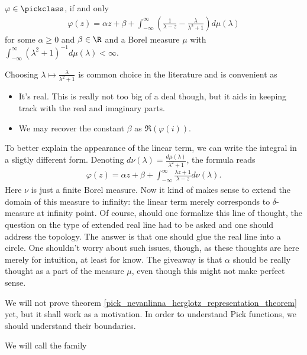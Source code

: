 \begin{lause}\label{pick_nevanlinna_herglotz_representation_theorem}
	$\varphi \in \pickclass$, if and only
	\begin{align}\label{pick_representation}
		\varphi(z) = \alpha z + \beta + \int_{-\infty}^{\infty} \left(\frac{1}{\lambda - z} - \frac{\lambda}{\lambda^2 + 1}\right) d \mu(\lambda)
	\end{align}
	for some $\alpha \geq 0$ and $\beta \in \R$ and a Borel measure $\mu$ with $\int_{-\infty}^{\infty} (\lambda^2 + 1)^{-1} d \mu(\lambda) < \infty$.
\end{lause}

Choosing $\lambda \mapsto \frac{\lambda}{\lambda^2 + 1}$ is common choice in the literature and is convenient as
\begin{itemize}
	\item It's real. This is really not too big of a deal though, but it aids in keeping track with the real and imaginary parts.
	\item We may recover the constant $\beta$ as $\Re(\varphi(i))$.
\end{itemize}

To better explain the appearance of the linear term, we can write the integral in a sligtly different form. Denoting $d \nu(\lambda) = \frac{d \mu(\lambda)}{\lambda^2 + 1}$, the formula reads
\begin{align*}
	\varphi(z) = \alpha z + \beta + \int_{-\infty}^{\infty} \frac{\lambda z + 1}{\lambda - z} d \nu(\lambda).
\end{align*}
Here $\nu$ is just a finite Borel measure. Now it kind of makes sense to extend the domain of this measure to infinity: the linear term merely corresponds to $\delta$-measure at infinity point. Of course, should one formalize this line of thought, the question on the type of extended real line had to be asked and one should address the topology. The answer is that one should glue the real line into a circle. One shouldn't worry about such issues, though, as these thoughts are here merely for intuition, at least for know. The giveaway is that $\alpha$ should be really thought as a part of the measure $\mu$, even though this might not make perfect sense.

We will not prove theorem \ref{pick_nevanlinna_herglotz_representation_theorem} yet, but it shall work as a motivation. In order to understand Pick functions, we should understand their boundaries.

We will call the family

